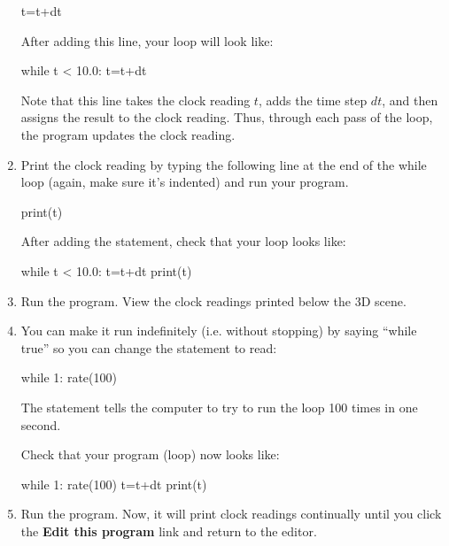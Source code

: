 \begin{enumerate}
\begin{myvpython}
	t=t+dt
\end{myvpython}

After adding this line, your  loop will look like:

\begin{myvpython}
while t < 10.0:
	t=t+dt
\end{myvpython}

Note that this line takes the clock reading $t$, adds the time step $dt$, and then assigns the result to the clock reading. Thus, through each pass of the loop, the program updates the clock reading.

\item Print the clock reading by typing the following line at the end of the while loop (again, make sure it's indented) and run your program.

\begin{myvpython}
	print(t)
\end{myvpython}

After adding the  statement, check that your  loop looks like:

\begin{myvpython}
while t < 10.0:
	t=t+dt
	print(t)
\end{myvpython}

\item Run the program. View the clock readings printed below the 3D scene.

\item You can make it run indefinitely (i.e. without stopping) by saying ``while true''  so you can change the  statement to read:

	\begin{verbatimtab}
	while 1:
		rate(100)
	\end{verbatimtab}	

The  statement tells the computer to try to run the loop 100 times in one second.

Check that your program (loop) now looks like:

\begin{myvpython}
while 1:
	rate(100)
	t=t+dt
	print(t)
\end{myvpython}

\item Run the program.  Now, it will print clock readings continually until you click the  {\bf Edit this program} link and return to the editor.


\end{enumerate}

